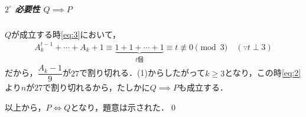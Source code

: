 \documentclass[../../main.tex]{subfiles}
\begin{document}
\subparagraph{$2^\circ$ 必要性 $Q\implies P$}

$Q$が成立する時\cref{eq:3}において，
\begin{align}
  A_{k}^{t-1}+\cdots+A_{k}+1\equiv\underbrace{1+1+\cdots+1}_{t個}\equiv t\not\equiv0\pmod3\quad(\because t\perp3)
\end{align}
だから，$\dfrac{A_{k}-1}{9}$が$27$で割り切れる．(1)からしたがって$k\ge3$となり，この時\cref{eq:2}より$n$が$27$で割り切れるから，たしかに$Q\implies P$も成立する．
\casesend

以上から，$P\iff Q$となり，題意は示された．\qed
\end{document}
